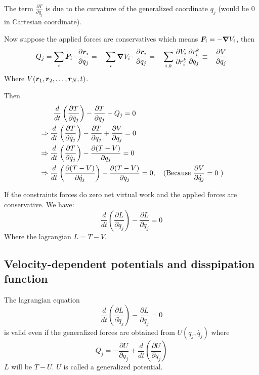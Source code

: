 \documentclass[12pt]{article}
\begin{document}
The term  $\frac{\partial T}{\partial q_j}$  is due to the curvature of the generalized coordinate $q_j$ (would be 0 in Cartesian coordinate).

Now suppose the applied forces are conservatives which means $\boldsymbol{F}_i = -\grad V_i$,  then $$
Q_j = \sum_i \boldsymbol{F}_i \cdot \frac{\partial \boldsymbol{r}_i}{\partial q_j} 
= - \sum_i  \grad V_i \cdot \frac{\partial \boldsymbol{r}_i}{\partial q_j} 
= - \sum_{i, k}  \frac{\partial V_i}{\partial r_i^k} \frac{\partial r_i^k}{\partial q_j} 
\equiv - \frac{\partial V}{\partial q_j}$$
Where $V(\boldsymbol{r}_1, \boldsymbol{r}_2, \ldots, \boldsymbol{r}_N, t)$. 

Then $$
\begin{aligned}
	&\quad \quad \frac{d}{dt}\left(  \frac{\partial T}{\partial \dot{q}_j} \right) -  \frac{\partial T}{\partial q_j} -  Q_j = 0 \\ 
	&\Rightarrow   \frac{d}{dt}\left(  \frac{\partial T}{\partial \dot{q}_j} \right) -  \frac{\partial T}{\partial q_j}  + \frac{\partial V}{\partial q_j} = 0 \\
	&\Rightarrow   \frac{d}{dt}\left(  \frac{\partial T}{\partial \dot{q}_j} \right) -  \frac{\partial (T - V)}{\partial q_j} = 0 \\
	&\Rightarrow   \frac{d}{dt}\left(  \frac{\partial (T - V)}{\partial \dot{q}_j} \right) -  \frac{\partial (T - V)}{\partial q_j} = 0
	,\quad \textnormal{(Because $\frac{\partial V}{\partial \dot{q}_j} = 0$ )}
\end{aligned}
$$

\begin{theorem}
\textnormal{If the constraints forces do zero net virtual work and the applied forces are conservative. We have:
  $$ \frac{d}{dt} \left(\frac{\partial L}{\partial \dot{q}_j}\right) - \frac{\partial L}{\partial q_j} = 0$$
Where the lagrangian $L = T - V$. 
}
\end{theorem}

\subsection{Velocity-dependent potentials and disspipation function}

\begin{theorem}
\textnormal{
	The lagrangian equation
	$$ \frac{d}{dt} \left(\frac{\partial L}{\partial \dot{q}_j}\right) - \frac{\partial L}{\partial q_j} = 0$$
 is valid even if the generalized forces are obtained from $U(q_j, \dot{q_j})$ where $$Q_j = -\frac{\partial U}{\partial q_j} + \frac{d}{dt}\left(\frac{\partial U}{\partial \dot{q}_j}\right)$$ $L$ will be $T-U$. $U$ is called a generalized potential.
}
\end{theorem}
\end{document}
